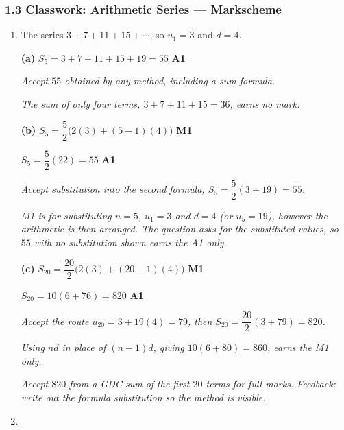 \documentclass[12pt, twoside]{article}
\begin{document}
\subsubsection*{1.3 Classwork: Arithmetic Series --- Markscheme}

\begin{enumerate}[itemsep=0.3cm]

\item[1.] [Maximum mark: 5]

The series $3 + 7 + 11 + 15 + \cdots$, so $u_{1} = 3$ and $d = 4$.

\medskip

\textbf{(a)} $S_{5} = 3 + 7 + 11 + 15 + 19 = 55$ \hfill \textbf{A1}

\emph{Accept $55$ obtained by any method, including a sum formula.}

\emph{The sum of only four terms, $3 + 7 + 11 + 15 = 36$, earns no mark.}

\medskip

\textbf{(b)} $S_{5} = \dfrac{5}{2}\bigl(2(3) + (5 - 1)(4)\bigr)$ \hfill \textbf{M1}

$S_{5} = \dfrac{5}{2}(22) = 55$ \hfill \textbf{A1}

\emph{Accept substitution into the second formula,
$S_{5} = \dfrac{5}{2}(3 + 19) = 55$.}

\emph{M1 is for substituting $n = 5$, $u_{1} = 3$ and $d = 4$ (or
$u_{5} = 19$), however the arithmetic is then arranged. The question asks
for the substituted values, so $55$ with no substitution shown earns the
A1 only.}

\medskip

\textbf{(c)} $S_{20} = \dfrac{20}{2}\bigl(2(3) + (20 - 1)(4)\bigr)$ \hfill \textbf{M1}

$S_{20} = 10(6 + 76) = 820$ \hfill \textbf{A1}

\emph{Accept the route $u_{20} = 3 + 19(4) = 79$, then
$S_{20} = \dfrac{20}{2}(3 + 79) = 820$.}

\emph{Using $nd$ in place of $(n - 1)d$, giving $10(6 + 80) = 860$, earns
the M1 only.}

\emph{Accept $820$ from a GDC sum of the first $20$ terms for full marks.
Feedback: write out the formula substitution so the method is visible.}

\newpage

\item[2.] [Maximum mark: 7]


\end{enumerate}
\end{document}
